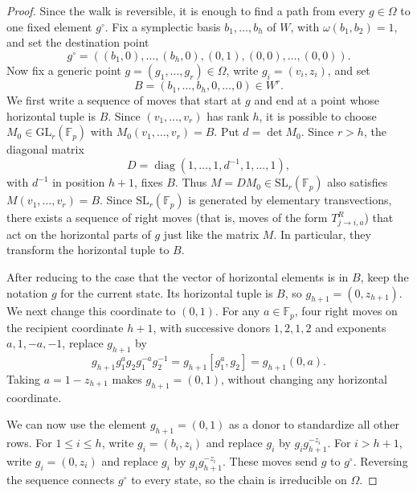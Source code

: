 \documentclass[11pt, reqno]{amsart}
\numberwithin{equation}{section}
\newcommand{\Fp}{\mathbb F_p}
\begin{document}
\begin{proof}
Since the walk is reversible, it is enough to find a path from every \(g\in\Omega\) to one fixed element $g^\circ$.  Fix a symplectic basis \(b_1,\ldots,b_h\) of
\(W\), with \(\omega(b_1,b_2)=1\), and set the destination point
\[
    g^\circ=((b_1,0),\ldots,(b_h,0),(0,1),(0,0),\ldots,(0,0)).
\]
Now fix a generic point \(g=(g_1,\ldots,g_r)\in\Omega\), write \(g_i=(v_i,z_i)\), and set
\[
    B=(b_1,\ldots,b_h,0,\ldots,0)\in W^r.
\]
We first write a sequence of moves that start at $g$ and end at a point whose horizontal tuple is \(B\).  Since
\((v_1,\ldots,v_r)\) has rank \(h\), it is possible to choose \(M_0\in\mathrm{GL}_r(\Fp)\) with
\(M_0(v_1,\ldots,v_r)=B\).  Put \(d=\det M_0\).  Since \(r>h\), the diagonal
matrix
\[
    D=\operatorname{diag}(1,\ldots,1,d^{-1},1,
    \ldots,1),
\]
with \(d^{-1}\) in position \(h+1\), fixes \(B\).  Thus
\(M=DM_0\in\mathrm{SL}_r(\Fp)\) also satisfies \(M(v_1,\ldots,v_r)=B\).  Since
\(\mathrm{SL}_r(\Fp)\) is generated by elementary transvections, there exists a sequence of right moves (that is, moves of the form $T^R_{j\to i,a}$) that act on the horizontal parts of $g$ just like the matrix $M$. In particular, they transform the
horizontal tuple to \(B\).

After reducing to the case that the vector of horizontal elements is in $B$, keep the notation \(g\) for the current state.
Its horizontal tuple is \(B\), so \(g_{h+1}=(0,z_{h+1})\).  We next change
this coordinate to \((0,1)\).  For any \(a\in\Fp\), four right moves on the
recipient coordinate \(h+1\), with successive donors \(1,2,1,2\) and exponents
\(a,1,-a,-1\), replace \(g_{h+1}\) by
\[
    g_{h+1}g_1^a g_2 g_1^{-a}g_2^{-1}
    =g_{h+1}[g_1^a,g_2]
    =g_{h+1}(0,a).
\]
Taking \(a=1-z_{h+1}\) makes \(g_{h+1}=(0,1)\), without changing any horizontal coordinate.

We can now use the element \(g_{h+1}=(0,1)\) as a donor to standardize all other rows. For \(1\le i\le h\), write
\(g_i=(b_i,z_i)\) and replace \(g_i\) by \(g_i g_{h+1}^{-z_i}\).  For
\(i>h+1\), write \(g_i=(0,z_i)\) and replace \(g_i\) by
\(g_i g_{h+1}^{-z_i}\).  These moves send \(g\) to \(g^\circ\).  Reversing the
sequence connects \(g^\circ\) to every state, so the chain is irreducible on
\(\Omega\).
\end{proof}
\end{document}
